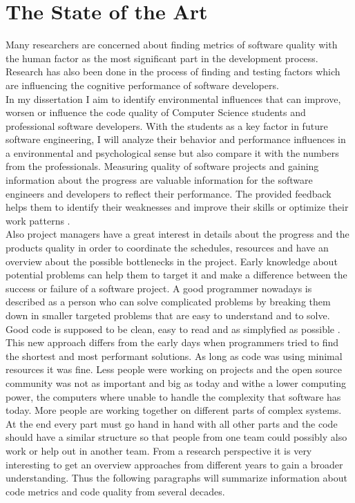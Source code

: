 \chapter{The State of the Art}

\begin{flushleft}
Many researchers are concerned about finding metrics of software quality with the human factor as the most significant part in the development process. Research has also been done in the process of finding and testing factors which are influencing the cognitive performance of software developers.\\
In my dissertation I aim to identify environmental influences that can improve, worsen or influence the code quality of Computer Science students and professional software developers.
With the students as a key factor in future software engineering, I will analyze their behavior and performance influences in a environmental and psychological sense but also compare it with the numbers from the professionals. \cite{denissen2008effects}
\bigbreak
Measuring quality of software projects and gaining information about the progress are valuable information for the software engineers and developers to reflect their performance. The provided feedback helps them to identify their weaknesses and improve their skills or optimize their work patterns \cite{johnson1999leap} \cite{Martin:2008:CCH:1388398}.\\
Also project managers have a great interest in details about the progress and the products quality in order to coordinate the schedules, resources and have an overview about the possible bottlenecks in the project.
Early knowledge about potential problems can help them to target it and make a difference between the success or failure of a software project.
\bigbreak
A good programmer nowadays is described as a person who can solve complicated problems by breaking them down in smaller targeted problems that are easy to understand and to solve. Good code is supposed to be clean, easy to read and as simplyfied as possible \cite{johnson1999leap}.
\\
This new approach differs from the early days when programmers tried to find the shortest and most performant solutions. As long as code was using minimal resources it was fine. Less people were working on projects and the open source community was not as important and big as today and withe a lower computing power, the computers where unable to handle the complexity that software has today. 
More people are working together on different parts of complex systems. At the end every part must go hand in hand with all other parts and the code should have a similar structure so that people from one team could possibly also work or help out in another team.
\bigbreak
From a research perspective it is very interesting to get an overview approaches from different years to gain a broader understanding. Thus the following paragraphs will summarize information about code metrics and code quality from several decades.
\end{flushleft}


